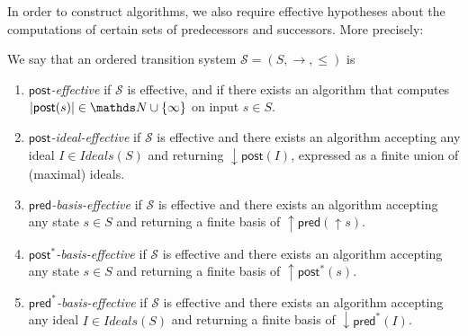 \documentclass[runningheads]{llncs}
\newcommand{\pred}{\textsf{pred}}
\newcommand{\post}{\textsf{post}}
\begin{document}
In order to construct algorithms, we also require effective hypotheses about the computations of certain sets of predecessors and successors. More precisely:
%
\begin{definition}\label{eff}
%
We say that an ordered transition system $\mathscr{S}=(S, \rightarrow, \leq)$ is
%
\begin{enumerate}\label{on effectivity}
%
\item {\em $\post$-effective} if $\mathscr{S}$ is effective, and if there
exists an algorithm that computes $|\post(s)| \in \N \cup \{\infty\}$ 
on input $s \in S$.
%
%
\item {\em $\post$-ideal-effective} if $\mathscr{S}$ is effective and there exists an algorithm accepting
any ideal $I \in Ideals(S)$ and returning $\mathop{\downarrow} \post(I)$, expressed as a finite union of (maximal) ideals.
%
\item {\em $\pred$-basis-effective} \cite{DBLP:journals/tcs/FinkelS01,DBLP:journals/iandc/AbdullaCJT00} if $\mathscr{S}$ is effective and there exists an algorithm accepting
any state $s \in S$ and returning a finite basis of $\mathop{\uparrow} \pred(\mathop{\uparrow} s)$.
%
%
\item {\em $\post^*$-basis-effective} \cite{DBLP:conf/gg/Ozkan22,DBLP:journals/corr/abs-2108-00889} if $\mathscr{S}$ is effective and there exists an algorithm accepting
any state $s \in S$ and returning a finite basis of $\mathop{\uparrow} \post^*(s)$.
%
\item {\em $\pred^*$-basis-effective} if $\mathscr{S}$ is effective and there exists an algorithm accepting
any ideal $I \in Ideals(S)$ and returning a finite basis of $\mathop{\downarrow} \pred^*(I)$.
\end{enumerate}
%
\end{definition}
\end{document}
